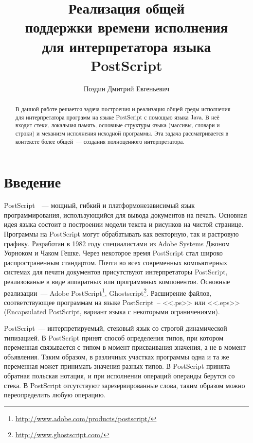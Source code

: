 \title{Реализация общей\\
поддержки времени исполнения\\
для интерпретатора языка PostScript}
%
\author{Поздин Дмитрий Евгеньевич}
%
%
%

\maketitle

\begin{abstract}
В данной работе решается задача построения и реализация общей среды исполнения для интерпретатора 
программ на языке PostScript с помощью языка Java. В неё входит стеки, локальная память, основные 
структуры языка (массивы, словари и строки) и механизм исполнения исходной программы. Эта задача 
рассматривается в контексте более общей~--- создания полноценного интерпретатора.
\end{abstract}

\section*{Введение}

PostScript~\cite{PLRM}~--- мощный, гибкий и платформонезависимый язык программирования, использующийся для вывода документов на печать. Основная идея языка состоит в построении модели текста и рисунков на чистой странице. Программы на PostScript могут обрабатывать как векторную, так и растровую графику. Разработан в 1982 году специалистами из Adobe Systems Джоном Уорноком и Чаком Гешке. Через некоторое время PostScript стал широко распространенным стандартом. Почти во всех современных компьютерных системах для печати документов присутствуют интерпретаторы PostScript, реализованые в виде аппаратных или программных компонентов. Основные реализации~--- Adobe PostScript\footnote{\url{http://www.adobe.com/products/postscript/}}, Ghostscript\footnote{\url{http://www.ghostscript.com/}}. Расширение файлов, соответствующее программам на языке PostScript~-- <<.ps>> или <<.eps>> (Encapsulated PostScript, вариант языка с некоторыми ограничениями).

PostScript~--- интерпретируемый, стековый язык со строгой динамической типизацией. В PostScript принят способ определения типов, при котором переменная связывается с типом в момент присваивания значения, а не в момент объявления. Таким образом, в различных участках программы одна и та же переменная может принимать значения разных типов. В PostScript принята обратная польская нотация, и при исполнении операций операнды берутся со стека. В PostScript отсутствуют зарезервированные слова, таким образом можно переопределить любую операцию. 

